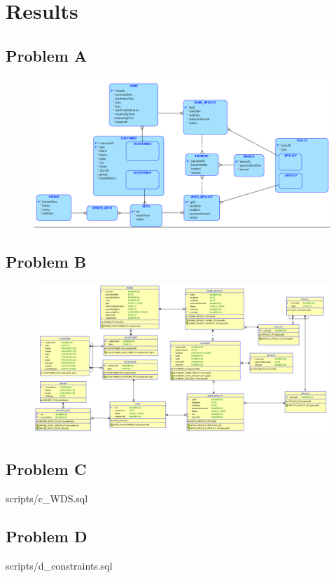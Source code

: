 \documentclass[12pt,english, openany]{book}
\begin{document}
\chapter{Results}

\section{Problem A}
    \begin{figure}[H]
        \centering
        \includegraphics[scale=0.35]{logical.png}
    \end{figure}
    
\section{Problem B}
    \begin{figure}[H]
        \centering
        \includegraphics[scale=0.33]{relational.png}
    \end{figure}
    
\section{Problem C}
 {scripts/c_WDS.sql}
\section{Problem D}
 {scripts/d_constraints.sql}
\end{document}
